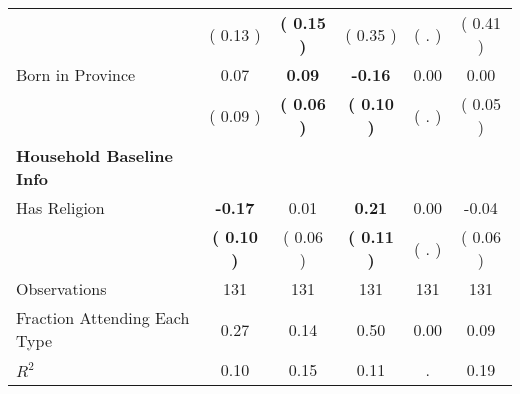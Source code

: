 \begin{table}[H]
{\begin{tabular}{lccccc}
\quad  & (     0.13 ) & \textbf{(     0.15 )}  & (     0.35 )  & (        . ) & (     0.41 ) \\
\quad Born in Province &      0.07 & \textbf{     0.09} & \textbf{    -0.16} &      0.00 &      0.00 \\
\quad  & (     0.09 ) & \textbf{(     0.06 )}  & \textbf{(     0.10 )}  & (        . ) & (     0.05 ) \\
\midrule
\textbf{Household Baseline Info} \\
\quad Has Religion & \textbf{    -0.17} &      0.01 & \textbf{     0.21} &      0.00 &     -0.04 \\
\quad  & \textbf{(     0.10 )} & (     0.06 )  & \textbf{(     0.11 )}  & (        . ) & (     0.06 ) \\
\midrule
Observations & 131 & 131 & 131 & 131 & 131 \\
Fraction Attending Each Type &      0.27 &      0.14 &      0.50 &      0.00 &      0.09 \\
\midrule
$ R^2$ &      0.10 &      0.15 &      0.11 &         . &      0.19 \\
\bottomrule
\end{tabular}}
\end{table}
